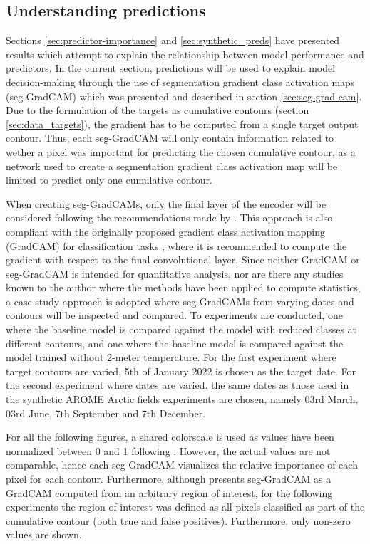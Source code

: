 \documentclass[../main/thesis.tex]{subfiles}
\begin{document}
\subsection{Understanding predictions}
Sections \ref{sec:predictor-importance} and \ref{sec:synthetic_preds} have presented results which attempt to explain the relationship between model performance and predictors. In the current section, predictions will be used to explain model decision-making through the use of segmentation gradient class activation maps (seg-GradCAM) \citep{Vinogradova2020} which was presented and described in section \ref{sec:seg-grad-cam}. Due to the formulation of the targets as cumulative contours (section \ref{sec:data_targets}), the gradient has to be computed from a single target output contour. Thus, each seg-GradCAM will only contain information related to wether a pixel was important for predicting the chosen cumulative contour, as a network used to create a segmentation gradient class activation map will be limited to predict only one cumulative contour. 

When creating seg-GradCAMs, only the final layer of the encoder will be considered following the recommendations made by \citet{Vinogradova2020}. This approach is also compliant with the originally proposed gradient class activation mapping (GradCAM) for classification tasks \citep{Selvaraju2016}, where it is recommended to compute the gradient with respect to the final convolutional layer. Since neither GradCAM or seg-GradCAM is intended for quantitative analysis, nor are there any studies known to the author where the methods have been applied to compute statistics, a case study approach is adopted where seg-GradCAMs from varying dates and contours will be inspected and compared. To experiments are conducted, one where the baseline model is compared against the model with reduced classes at different contours, and one where the baseline model is compared against the model trained without 2-meter temperature. For the first experiment where target contours are varied, 5th of January 2022 is chosen as the target date. For the second experiment where dates are varied. the same dates as those used in the synthetic AROME Arctic fields experiments are chosen, namely 03rd March, 03rd June, 7th September and 7th December. 

For all the following figures, a shared colorscale is used as values have been normalized between 0 and 1 following \citet{Vinogradova2020}. However, the actual values are not comparable, hence each seg-GradCAM visualizes the relative importance of each pixel for each contour. Furthermore, although \citet{Vinogradova2020} presents seg-GradCAM as a GradCAM computed from an arbitrary region of interest, for the following experiments the region of interest was defined as all pixels classified as part of the cumulative contour (both true and false positives). Furthermore, only non-zero values are shown.
\end{document}
